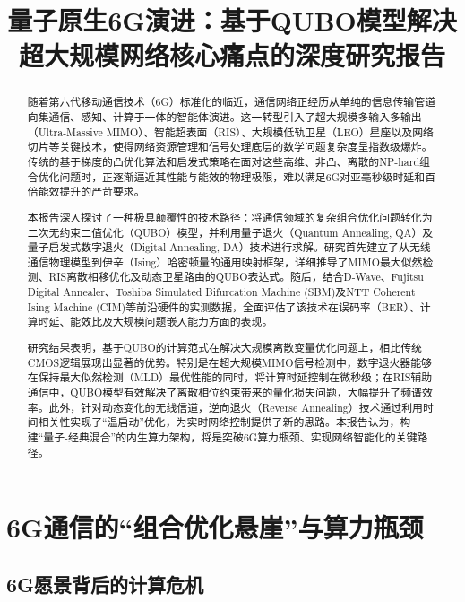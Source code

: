 \documentclass[12pt,a4paper]{article}
\title{\textbf{量子原生6G演进：基于QUBO模型解决超大规模网络核心痛点的深度研究报告}}
\author{}
\date{}
\begin{document}
\maketitle

\begin{abstract}
随着第六代移动通信技术（6G）标准化的临近，通信网络正经历从单纯的信息传输管道向集通信、感知、计算于一体的智能体演进。这一转型引入了超大规模多输入多输出（Ultra-Massive MIMO）、智能超表面（RIS）、大规模低轨卫星（LEO）星座以及网络切片等关键技术，使得网络资源管理和信号处理底层的数学问题复杂度呈指数级爆炸。传统的基于梯度的凸优化算法和启发式策略在面对这些高维、非凸、离散的NP-hard组合优化问题时，正逐渐逼近其性能与能效的物理极限，难以满足6G对亚毫秒级时延和百倍能效提升的严苛要求。

本报告深入探讨了一种极具颠覆性的技术路径：将通信领域的复杂组合优化问题转化为二次无约束二值优化（QUBO）模型，并利用量子退火（Quantum Annealing, QA）及量子启发式数字退火（Digital Annealing, DA）技术进行求解。研究首先建立了从无线通信物理模型到伊辛（Ising）哈密顿量的通用映射框架，详细推导了MIMO最大似然检测、RIS离散相移优化及动态卫星路由的QUBO表达式。随后，结合D-Wave、Fujitsu Digital Annealer、Toshiba Simulated Bifurcation Machine (SBM)及NTT Coherent Ising Machine (CIM)等前沿硬件的实测数据，全面评估了该技术在误码率（BER）、计算时延、能效比及大规模问题嵌入能力方面的表现。

研究结果表明，基于QUBO的计算范式在解决大规模离散变量优化问题上，相比传统CMOS逻辑展现出显著的优势。特别是在超大规模MIMO信号检测中，数字退火器能够在保持最大似然检测（MLD）最优性能的同时，将计算时延控制在微秒级；在RIS辅助通信中，QUBO模型有效解决了离散相位约束带来的量化损失问题，大幅提升了频谱效率。此外，针对动态变化的无线信道，逆向退火（Reverse Annealing）技术通过利用时间相关性实现了``温启动''优化，为实时网络控制提供了新的思路。本报告认为，构建``量子-经典混合''的内生算力架构，将是突破6G算力瓶颈、实现网络智能化的关键路径。
\end{abstract}

\tableofcontents
\newpage

\section{6G通信的``组合优化悬崖''与算力瓶颈}

\subsection{6G愿景背后的计算危机}
\end{document}
